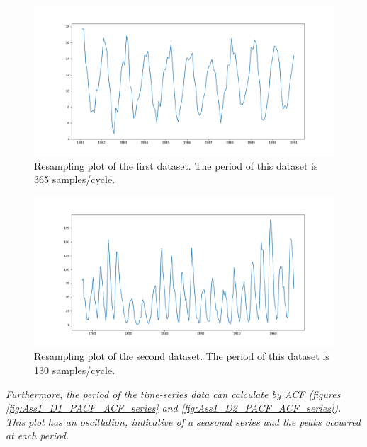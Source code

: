 \begin{figure}[H]
    \centering
    \begin{minipage}[b]{1\textwidth}
        \includegraphics[width=\textwidth]{figures/Ass1/Ass1_D1_resample.png}
    \end{minipage}
    \caption{Resampling plot of the first dataset. The period of this dataset is 365 samples/cycle. }
    \label{fig:Ass1_D1_resample}
\end{figure}

\begin{figure}[H]
    \centering
    \begin{minipage}[b]{1\textwidth}
        \includegraphics[width=\textwidth]{figures/Ass1/Ass1_D2_resample.png}
    \end{minipage}
    \caption{Resampling plot of the second dataset. The period of this dataset is 130 samples/cycle.}
    \label{fig:Ass1_D2_resample}
\end{figure}


\textit{Furthermore, the period of the time-series data can calculate by \gls{ACF} (figures \ref{fig:Ass1_D1_PACF_ACF_series} and \ref{fig:Ass1_D2_PACF_ACF_series}). This plot has an oscillation, indicative of a seasonal series and the peaks occurred at each period. }

